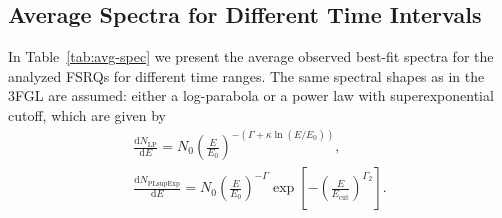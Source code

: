 \documentclass[twocolumn]{aastex62}
\begin{document}
\begin{appendix}

\section{Average Spectra for Different Time Intervals}
\label{sec:avg-spec}
In Table~\ref{tab:avg-spec} we present the average observed best-fit spectra for the analyzed FSRQs for different time ranges. 
The same spectral shapes as in the 3FGL are assumed:  either a log-parabola or a power law with superexponential cutoff, which are given by
\begin{eqnarray}
    \frac{\mathrm{d}N_\mathrm{LP}}{\mathrm{d}E} = N_0 \left(\frac{E}{E_0}\right)^{-(\Gamma + \kappa\ln(E / E_0))}, \label{eq:avg-spec-lp}\\
    \frac{\mathrm{d}N_\mathrm{PLsupExp}}{\mathrm{d}E} = N_0 \left(\frac{E}{E_0}\right)^{-\Gamma}\exp\left[-\left(\frac{E}{E_\mathrm{cut}} \right)^{\Gamma_2}\right]\label{eq:avg-spec-plexp}.
\end{eqnarray}


\end{appendix}
\end{document}
